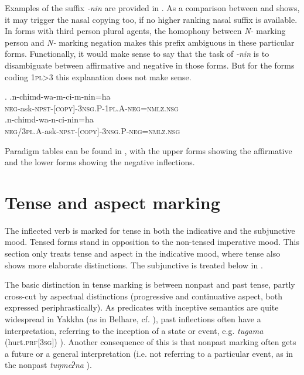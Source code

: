 	
Examples of the suffix \emph{-nin} are provided in \Next. As a comparison between \Next[a] and \Next[b] shows, it may trigger the nasal copying too, if no higher ranking nasal suffix is available. In forms with third person plural agents, the homophony between \emph{N-} marking person and \emph{N-} marking negation makes this prefix ambiguous in these particular forms. Functionally, it would make sense to say that the task of \emph{-nin} is to disambiguate between affirmative and negative in those forms. But for the forms coding {\scshape 1pl>3} this explanation does not make sense. 
 
 \ex. \ag.n-chimd-wa-m-ci-m-nin=ha\\
			{\scshape neg-}ask{\scshape -npst-[copy]-3nsg.P-1pl.A-neg=nmlz.nsg}\\
 	\bg.n-chimd-wa-n-ci-nin=ha\\
		{\scshape neg/3pl.A-}ask{\scshape -npst-[copy]-3nsg.P-neg=nmlz.nsg}\\
		
Paradigm tables can be found in , with the upper forms showing the affirmative and the lower forms showing the negative inflections. 	


\section{Tense and aspect marking }\label{tense}

The inflected verb is marked  for tense in both the indicative and the subjunctive mood. Tensed forms stand in opposition to the non-tensed imperative mood. This section only treats tense and aspect in the indicative mood, where tense also shows more elaborate distinctions. The subjunctive is treated below in .

The basic distinction in tense marking is between nonpast and past tense, partly cross-cut by aspectual distinctions (progressive and continuative aspect, both expressed periphrastically). As predicates with inceptive semantics are quite wide\-spread in Yakkha (as in Belhare, cf. \citealt{Bickel1996Aspect}), past inflections often have a  interpretation, referring to the inception of a state or event, e.g. \emph{tugama}  (hurt.{\scshape prf[3sg]}) ). Another consequence of this is that nonpast marking often gets a future  or a general interpretation (i.e. not referring to a particular event, as in  the nonpast \emph{tuŋmeʔna} ). 

